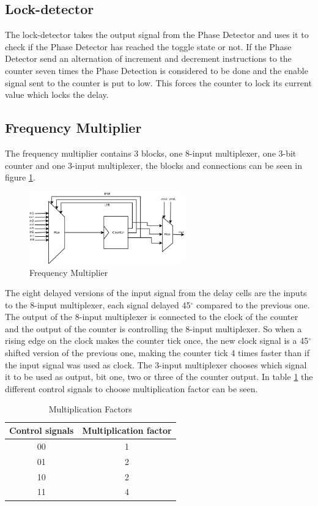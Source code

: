 \documentclass[a4paper,12pt]{article} \usepackage{graphicx}
\newcommand{\degree}{\ensuremath{^\circ}}
\begin{document}
\subsection{Lock-detector}
The lock-detector takes the output signal from the Phase Detector and uses
it to check if the Phase Detector has reached the toggle state or not. If the Phase
Detector send an alternation of increment and decrement instructions to the counter
seven times the Phase Detection is considered to be done and the enable 
signal sent to the counter is put to low. This forces the counter to lock its 
current value which locks the delay.


\subsection{Frequency Multiplier}
The frequency multiplier contains 3 blocks, one 8-input multiplexer, one 3-bit
counter and one 3-input multiplexer, the blocks and connections can be seen in 
figure \ref{fig:freq_mult}.
\begin{figure}[h!b]
        \centering
        \includegraphics[width=0.6\textwidth]{../Bilder/freq_mult_high.png}
        \caption{Frequency Multiplier}
        \label{fig:freq_mult}
\end{figure}
The eight delayed versions of the input signal from the delay cells
are the inputs to the 8-input multiplexer, each signal delayed 45\degree 
compared to the previous one. The output of the 8-input multiplexer is 
connected to the clock of the counter and the output of the counter is 
controlling the 8-input multiplexer. So when a rising edge on the clock
makes the counter tick once, the new clock signal is a 45\degree shifted
version of the previous one, making the counter tick 4 times faster than
if the input signal was used as clock. The 3-input multiplexer chooses which 
signal it to be used as output, bit one, two or three of the counter output. 
In table \ref{tab:mult_fact} the different control signals to choose 
multiplication factor can be seen.
\begin{table}[h!]
        \centering
        \begin{tabular}{|c|c|}
                \hline
                \textbf{Control signals} & \textbf{Multiplication factor} \\
                \hline
                00 & 1 \\
                01 & 2 \\
                10 & 2 \\
                11 & 4 \\
                \hline
        \end{tabular}
        \caption{Multiplication Factors}
        \label{tab:mult_fact}
\end{table}
\end{document}
